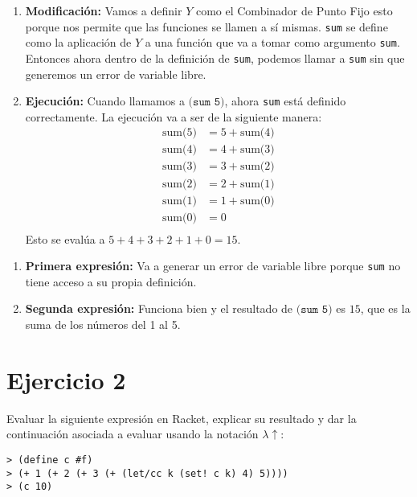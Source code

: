 \documentclass{article}
\begin{document}
\begin{enumerate}
    \item \textbf{Modificación:}
    Vamos a definir \( Y \) como el Combinador de Punto Fijo esto porque nos permite que las funciones se llamen a sí mismas.
    \texttt{sum} se define como la aplicación de \( Y \) a una función que va a tomar como argumento \texttt{sum}. Entonces ahora dentro de la definición de \texttt{sum}, podemos llamar a \texttt{sum} sin que generemos un error de variable libre.

    \item \textbf{Ejecución:}
    Cuando llamamos a \( \texttt{(sum 5)} \), ahora \texttt{sum} está definido correctamente.
    La ejecución va a ser de la siguiente manera:
    \begin{align*}
        \text{sum(5)} & = 5 + \text{sum(4)} \\
        \text{sum(4)} & = 4 + \text{sum(3)} \\
        \text{sum(3)} & = 3 + \text{sum(2)} \\
        \text{sum(2)} & = 2 + \text{sum(1)} \\
        \text{sum(1)} & = 1 + \text{sum(0)} \\
        \text{sum(0)} & = 0 \\
    \end{align*}
    Esto se evalúa a \( 5 + 4 + 3 + 2 + 1 + 0 = 15 \).
\end{enumerate}

\begin{enumerate}
    \item \textbf{Primera expresión:} Va a generar un error de variable libre porque \texttt{sum} no tiene acceso a su propia definición.
    \item \textbf{Segunda expresión:} Funciona bien y el resultado de \( \texttt{(sum 5)} \) es \( 15 \), que es la suma de los números del 1 al 5.
\end{enumerate}

\section{Ejercicio 2}

Evaluar la siguiente expresión en Racket, explicar su resultado y dar la continuación asociada a evaluar usando la notación $\lambda \uparrow$:

\begin{verbatim}
> (define c #f)
> (+ 1 (+ 2 (+ 3 (+ (let/cc k (set! c k) 4) 5))))
> (c 10)
\end{verbatim}
\end{document}
